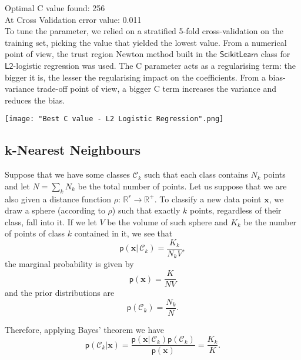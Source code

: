 \documentclass[a4paper]{article}
\begin{document}
Optimal C value found: 256\\
At Cross Validation error value: 0.011\\

To tune the parameter, we relied on a stratified 5-fold cross-validation
on the training set, picking the value that yielded the lowest value.
From a numerical point of view, the trust region Newton method built
in the $\mathsf{ScikitLearn}$ class for $\mathsf{L2}$-logistic regression
was used.
The C parameter acts as a regularising term: the bigger it is, the lesser the regularising impact on the coefficients.
From a bias-variance trade-off point of view, a bigger C term increases the variance and reduces the bias.
 
\texttt{[image: "Best C value - L2 Logistic Regression".png]}

\subsection{k-Nearest Neighbours}

Suppose that we have some classes $\mathcal{C}_{k}$ such that each
class contains $N_{k}$ points and let $N=\sum_{k}N_{k}$ be the total
number of points. Let us suppose that we are also given a distance
function $\rho:\,\mathbb{R}^{r}\rightarrow\mathbb{R}^{+}$. To classify
a new data point $\mathbf{x}$, we draw a sphere (according to $\rho$)
such that exactly $k$ points, regardless of their class, fall into
it. If we let $V$ be the volume of such sphere and $K_{k}$ be the
number of points of class $k$ contained in it, we see that 
\begin{equation}
\mathsf{p}\left(\mathbf{x}|\,\mathcal{C}_{k}\right)=\frac{K_{k}}{N_{k}V},\label{eq:-10}
\end{equation}
the marginal probability is given by 
\begin{equation}
\mathsf{p}\left(\mathbf{x}\right)=\frac{K}{NV}\label{eq:-11}
\end{equation}
and the prior distributions are 
\begin{equation}
\mathsf{p}\left(\mathcal{C}_{k}\right)=\frac{N_{k}}{N}.\label{eq:-12}
\end{equation}

Therefore, applying Bayes' theorem we have 
\begin{equation}
\mathsf{p}\left(\mathcal{C}_{k}|\mathbf{x}\right)=\frac{\mathsf{p}\left(\mathbf{x}|\,\mathcal{C}_{k}\right)\mathsf{p}\left(\mathcal{C}_{k}\right)}{\mathsf{p}\left(\mathbf{x}\right)}=\frac{K_{k}}{K}.\label{eq:-13}
\end{equation}
\end{document}
